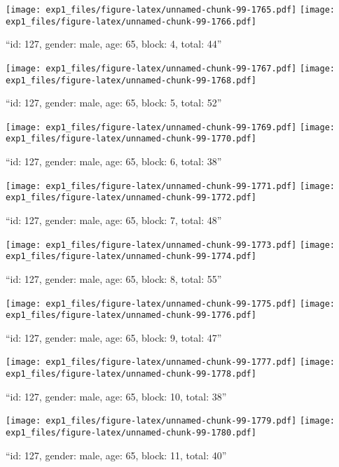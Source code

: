 \documentclass[,]{article}
\begin{document}
\texttt{[image: exp1\_files/figure-latex/unnamed-chunk-99-1765.pdf]}
\texttt{[image: exp1\_files/figure-latex/unnamed-chunk-99-1766.pdf]}

\newpage
[1] 

``id: 127, gender: male, age: 65, block: 4, total: 44''

\texttt{[image: exp1\_files/figure-latex/unnamed-chunk-99-1767.pdf]}
\texttt{[image: exp1\_files/figure-latex/unnamed-chunk-99-1768.pdf]}

\newpage
[1] 

``id: 127, gender: male, age: 65, block: 5, total: 52''

\texttt{[image: exp1\_files/figure-latex/unnamed-chunk-99-1769.pdf]}
\texttt{[image: exp1\_files/figure-latex/unnamed-chunk-99-1770.pdf]}

\newpage
[1] 

``id: 127, gender: male, age: 65, block: 6, total: 38''

\texttt{[image: exp1\_files/figure-latex/unnamed-chunk-99-1771.pdf]}
\texttt{[image: exp1\_files/figure-latex/unnamed-chunk-99-1772.pdf]}

\newpage
[1] 

``id: 127, gender: male, age: 65, block: 7, total: 48''

\texttt{[image: exp1\_files/figure-latex/unnamed-chunk-99-1773.pdf]}
\texttt{[image: exp1\_files/figure-latex/unnamed-chunk-99-1774.pdf]}

\newpage
[1] 

``id: 127, gender: male, age: 65, block: 8, total: 55''

\texttt{[image: exp1\_files/figure-latex/unnamed-chunk-99-1775.pdf]}
\texttt{[image: exp1\_files/figure-latex/unnamed-chunk-99-1776.pdf]}

\newpage
[1] 

``id: 127, gender: male, age: 65, block: 9, total: 47''

\texttt{[image: exp1\_files/figure-latex/unnamed-chunk-99-1777.pdf]}
\texttt{[image: exp1\_files/figure-latex/unnamed-chunk-99-1778.pdf]}

\newpage
[1] 

``id: 127, gender: male, age: 65, block: 10, total: 38''

\texttt{[image: exp1\_files/figure-latex/unnamed-chunk-99-1779.pdf]}
\texttt{[image: exp1\_files/figure-latex/unnamed-chunk-99-1780.pdf]}

\newpage
[1] 

``id: 127, gender: male, age: 65, block: 11, total: 40''
\end{document}
